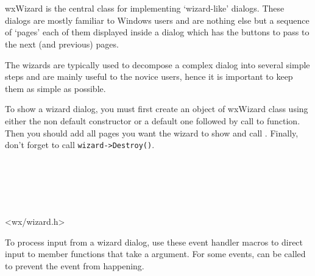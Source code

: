 
\section{}\label{wxwizard}

wxWizard is the central class for implementing `wizard-like' dialogs. These
dialogs are mostly familiar to Windows users and are nothing else but a
sequence of `pages' each of them displayed inside a dialog which has the
buttons to pass to the next (and previous) pages.

The wizards are typically used to decompose a complex dialog into several
simple steps and are mainly useful to the novice users, hence it is important
to keep them as simple as possible.

To show a wizard dialog, you must first create an object of wxWizard class
using either the non default constructor or a default one followed by call to 
 function. Then you should add all pages you
want the wizard to show and call .
Finally, don't forget to call {\tt wizard->Destroy()}.


\\
\\
\\
\\


<wx/wizard.h>


To process input from a wizard dialog, use these event handler macros to
direct input to member functions that take a 
 argument. For some events, 
 can be called to prevent the event from
happening.


